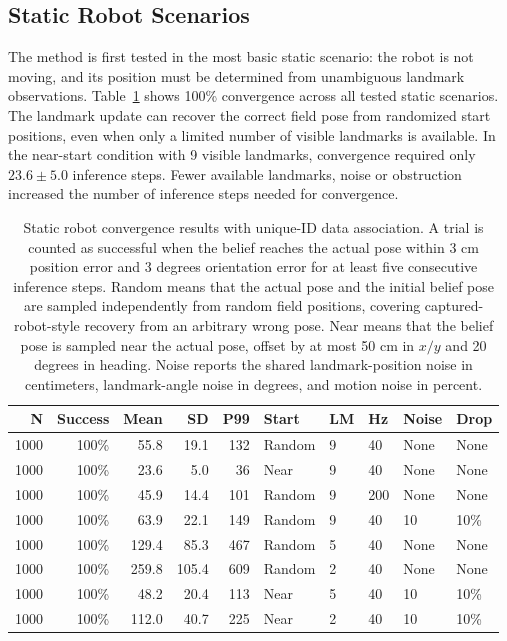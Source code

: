 \subsection{Static Robot Scenarios}
\label{subsec:experiments-static}

The method is first tested in the most basic static scenario: the robot is not moving, and its position must be determined from unambiguous landmark observations.
Table~\ref{tab:static-convergence-results} shows 100\% convergence across all tested static scenarios. The landmark update can recover the correct field pose from randomized start positions, even when only a limited number of visible landmarks is available. In the near-start condition with 9 visible landmarks, convergence required only $23.6 \pm 5.0$ inference steps. Fewer available landmarks, noise or obstruction increased the number of inference steps needed for convergence.

\begin{table}[!htbp]
    \centering
    \caption{\scriptsize Static robot convergence results with unique-ID data association. A trial is counted as successful when the belief reaches the actual pose within 3 cm position error and 3 degrees orientation error for at least five consecutive inference steps. Random means that the actual pose and the initial belief pose are sampled independently from random field positions, covering captured-robot-style recovery from an arbitrary wrong pose. Near means that the belief pose is sampled near the actual pose, offset by at most 50 cm in $x/y$ and 20 degrees in heading. Noise reports the shared landmark-position noise in centimeters, landmark-angle noise in degrees, and motion noise in percent.}
    \label{tab:static-convergence-results}
    \scriptsize
    \begin{tabular}{rrrrrlllll}
        \toprule
        N & Success & Mean & SD & P99 & Start & LM & Hz & Noise & Drop \\
        \midrule
        1000 & 100\% & 55.8 & 19.1 & 132 & Random & 9 & 40 & None & None \\
        1000 & 100\% & 23.6 & 5.0 & 36 & Near & 9 & 40 & None & None \\
        1000 & 100\% & 45.9 & 14.4 & 101 & Random & 9 & 200 & None & None \\
        1000 & 100\% & 63.9 & 22.1 & 149 & Random & 9 & 40 & 10 & 10\% \\
        1000 & 100\% & 129.4 & 85.3 & 467 & Random & 5 & 40 & None & None \\
        1000 & 100\% & 259.8 & 105.4 & 609 & Random & 2 & 40 & None & None \\
        1000 & 100\% & 48.2 & 20.4 & 113 & Near & 5 & 40 & 10 & 10\% \\
        1000 & 100\% & 112.0 & 40.7 & 225 & Near & 2 & 40 & 10 & 10\% \\
        \bottomrule
    \end{tabular}
\end{table}
\FloatBarrier

